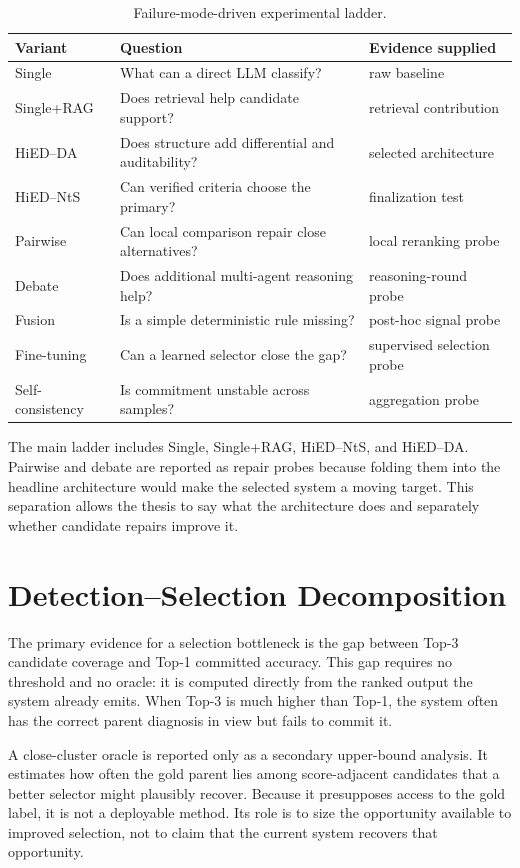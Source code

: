 \begin{table}[htbp]
\centering
\caption{Failure-mode-driven experimental ladder.}
\label{tab:failure-ladder-rewrite}
\begin{tabularx}{\textwidth}{p{2.7cm}X X}
\toprule
Variant & Question & Evidence supplied\\
\midrule
Single & What can a direct LLM classify? & raw baseline\\
Single+RAG & Does retrieval help candidate support? & retrieval contribution\\
HiED--DA & Does structure add differential and auditability? & selected architecture\\
HiED--NtS & Can verified criteria choose the primary? & finalization test\\
Pairwise & Can local comparison repair close alternatives? & local reranking probe\\
Debate & Does additional multi-agent reasoning help? & reasoning-round probe\\
Fusion & Is a simple deterministic rule missing? & post-hoc signal probe\\
Fine-tuning & Can a learned selector close the gap? & supervised selection probe\\
Self-consistency & Is commitment unstable across samples? & aggregation probe\\
\bottomrule
\end{tabularx}
\end{table}

The main ladder includes Single, Single+RAG, HiED--NtS, and HiED--DA. Pairwise and debate are reported as repair probes because folding them into the headline architecture would make the selected system a moving target. This separation allows the thesis to say what the architecture does and separately whether candidate repairs improve it.

\section{Detection--Selection Decomposition}

The primary evidence for a selection bottleneck is the gap between Top-3 candidate coverage and Top-1 committed accuracy. This gap requires no threshold and no oracle: it is computed directly from the ranked output the system already emits. When Top-3 is much higher than Top-1, the system often has the correct parent diagnosis in view but fails to commit it.

A close-cluster oracle is reported only as a secondary upper-bound analysis. It estimates how often the gold parent lies among score-adjacent candidates that a better selector might plausibly recover. Because it presupposes access to the gold label, it is not a deployable method. Its role is to size the opportunity available to improved selection, not to claim that the current system recovers that opportunity.

